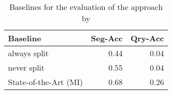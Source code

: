 \begin{table}[t]
 \caption{Baselines for the evaluation of the approach by \citet{Bergsma:2007}}
 \label{table-baselines-bergsma-2007}
 \centering
 \small
 \begin{tabular}{@{}lrr@{}}
  \toprule
 Baseline & Seg-Acc & Qry-Acc\\
  \midrule
  always split & 0.44 & 0.04\\
  never split & 0.55 & 0.04\\
  State-of-the-Art (MI) & 0.68 & 0.26\\
  \bottomrule
 \end{tabular}
\end{table}